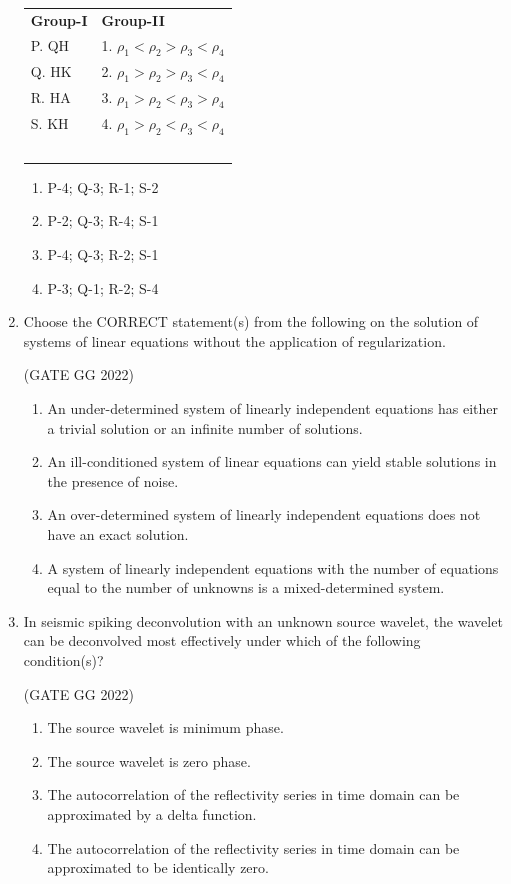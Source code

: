 \documentclass[journal]{IEEEtran}
\begin{document}
\begin{enumerate}
\begin{tabular}{l l}
\textbf{Group-I} &\textbf{Group-II}  \\ 
P. QH & 1. $\rho_1 < \rho_2 > \rho_3 < \rho_4$ \\ 
Q. HK & 2. $\rho_1 > \rho_2 > \rho_3 < \rho_4$ \\ 
R. HA & 3. $\rho_1 > \rho_2 < \rho_3 > \rho_4$ \\ 
S. KH & 4. $\rho_1 > \rho_2 < \rho_3 < \rho_4$ \\ \
\end{tabular}

\begin{enumerate}
\item P-4; Q-3; R-1; S-2  
\item P-2; Q-3; R-4; S-1  
\item P-4; Q-3; R-2; S-1  
\item P-3; Q-1; R-2; S-4  
\end{enumerate}

\item Choose the CORRECT statement(s) from the following on the solution of systems of linear equations without the application of regularization.  

\hfill(GATE GG 2022)
\begin{enumerate}
\item An under-determined system of linearly independent equations has either a trivial solution or an infinite number of solutions.  
\item An ill-conditioned system of linear equations can yield stable solutions in the presence of noise.  
\item An over-determined system of linearly independent equations does not have an exact solution.  
\item A system of linearly independent equations with the number of equations equal to the number of unknowns is a mixed-determined system.  
\end{enumerate}

\item In seismic spiking deconvolution with an unknown source wavelet, the wavelet can be deconvolved most effectively under which of the following condition(s)?

\hfill(GATE GG 2022)
\begin{enumerate}
\item The source wavelet is minimum phase.  
\item The source wavelet is zero phase.  
\item The autocorrelation of the reflectivity series in time domain can be approximated by a delta function.  
\item The autocorrelation of the reflectivity series in time domain can be approximated to be identically zero.  
\end{enumerate}


\end{enumerate}
\end{document}
